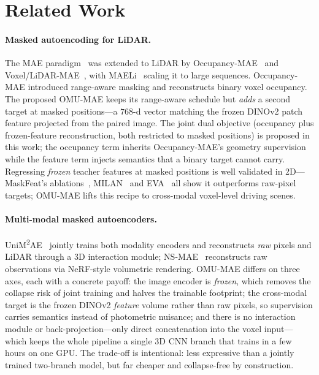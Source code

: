 \section{Related Work}

\paragraph{Masked autoencoding for LiDAR.}
The MAE paradigm~\cite{mae} was extended to LiDAR by
Occupancy-MAE~\cite{occmae} and Voxel/LiDAR-MAE~\cite{hess2023lidar}, with
MAELi~\cite{maeli} scaling it to large sequences. Occupancy-MAE introduced
range-aware masking and reconstructs binary voxel occupancy. The proposed
OMU-MAE keeps its range-aware schedule but \emph{adds} a second target at
masked positions---a $768$-d vector matching the frozen DINOv2 patch
feature projected from the paired image. The joint dual objective
(occupancy plus frozen-feature reconstruction, both restricted to masked
positions) is proposed in this work; the occupancy term inherits
Occupancy-MAE's geometry supervision while the feature term injects
semantics that a binary target cannot carry. Regressing \emph{frozen}
teacher features at masked positions is well validated in 2D---MaskFeat's
ablations~\cite{maskfeat}, MILAN~\cite{milan} and EVA~\cite{eva} all show
it outperforms raw-pixel targets; OMU-MAE lifts this recipe to
cross-modal voxel-level driving scenes.

\paragraph{Multi-modal masked autoencoders.}
UniM\textsuperscript{2}AE~\cite{unim2ae} jointly trains both modality
encoders and reconstructs \emph{raw} pixels and LiDAR through a 3D
interaction module; NS-MAE~\cite{nsmae} reconstructs raw observations via
NeRF-style volumetric rendering. OMU-MAE differs on three axes, each with
a concrete payoff: the image encoder is \emph{frozen}, which removes the
collapse risk of joint training and halves the trainable footprint; the
cross-modal target is the frozen DINOv2 \emph{feature} volume rather than
raw pixels, so supervision carries semantics instead of photometric
nuisance; and there is no interaction module or back-projection---only
direct concatenation into the voxel input---which keeps the whole pipeline
a single 3D CNN branch that trains in a few hours on one GPU. The
trade-off is intentional: less expressive than a jointly trained
two-branch model, but far cheaper and collapse-free by construction.

